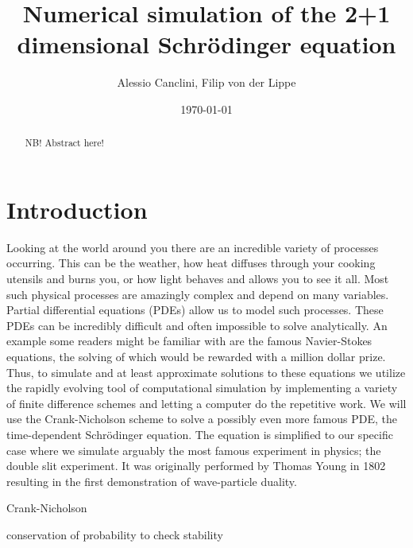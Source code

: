 \documentclass[english,notitlepage,reprint,nofootinbib]{revtex4-1}  %
\begin{document}
\title{Numerical simulation of the 2+1 dimensional Schrödinger equation}  %
\author{Alessio Canclini, Filip von der Lippe} %
\date{\today}                             %
\noaffiliation                            %

\begin{abstract}
   NB! Abstract here!
\end{abstract}
\maketitle


\section{Introduction}
%
Looking at the world around you there are an incredible variety of processes occurring. This can be the weather, how heat diffuses through your cooking utensils and burns you, or how light behaves and allows you to see it all. Most such physical processes are amazingly complex and depend on many variables. Partial differential equations (PDEs) allow us to model such processes.
These PDEs can be incredibly difficult and often impossible to solve analytically. An example some readers might be familiar with are the famous Navier-Stokes equations, the solving of which would be rewarded with a million dollar prize. Thus, to simulate and at least approximate solutions to these equations we utilize the rapidly evolving tool of computational simulation by implementing a variety of finite difference schemes and letting a computer do the repetitive work. 
We will use the Crank-Nicholson scheme to solve a possibly even more famous PDE, the time-dependent Schrödinger equation. The equation is simplified to our specific case where we simulate arguably the most famous experiment in physics; the double slit experiment. It was originally performed by Thomas Young in 1802 resulting in the first demonstration of wave-particle duality. 

Crank-Nicholson

conservation of probability to check stability

\end{document}
